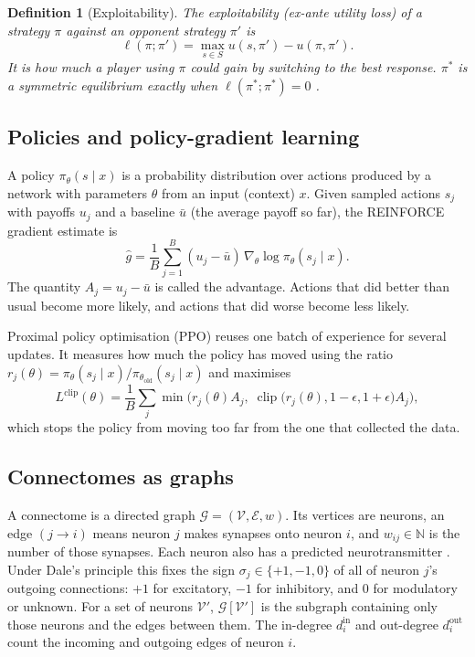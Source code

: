 \documentclass{article}
\newtheorem{definition}{Definition}
\newcommand{\G}{\mathcal{G}}
\newcommand{\Vset}{\mathcal{V}}
\newcommand{\Eset}{\mathcal{E}}
\newcommand{\clip}{\operatorname{clip}}
\newcommand{\expl}{\ell}
\begin{document}
\begin{definition}[Exploitability]
The exploitability (ex-ante utility loss) of a strategy $\pi$ against an opponent strategy $\pi'$ is
\[
\expl(\pi;\pi') = \max_{s\in S} u(s,\pi') - u(\pi,\pi').
\]
It is how much a player using $\pi$ could gain by switching to the best response. $\pi^*$ is a symmetric equilibrium exactly when $\expl(\pi^*;\pi^*) = 0$ \citep{bichler2021}.
\end{definition}

\subsection{Policies and policy-gradient learning}

A policy $\pi_\theta(s \mid x)$ is a probability distribution over actions produced by a network with parameters $\theta$ from an input (context) $x$. Given sampled actions $s_j$ with payoffs $u_j$ and a baseline $\bar u$ (the average payoff so far), the REINFORCE gradient estimate \citep{williams1992} is
\[
\hat g = \frac1B \sum_{j=1}^{B} (u_j - \bar u)\, \nabla_\theta \log \pi_\theta(s_j \mid x).
\]
The quantity $A_j = u_j - \bar u$ is called the advantage. Actions that did better than usual become more likely, and actions that did worse become less likely.

Proximal policy optimisation (PPO) \citep{schulman2017} reuses one batch of experience for several updates. It measures how much the policy has moved using the ratio $r_j(\theta) = \pi_\theta(s_j\mid x)/\pi_{\theta_{\mathrm{old}}}(s_j \mid x)$ and maximises
\[
L^{\mathrm{clip}}(\theta) = \frac1B \sum_j \min\!\Big( r_j(\theta) A_j,\; \clip\big(r_j(\theta), 1-\epsilon, 1+\epsilon\big) A_j\Big),
\]
which stops the policy from moving too far from the one that collected the data.

\subsection{Connectomes as graphs}

A connectome is a directed graph $\G = (\Vset, \Eset, w)$. Its vertices are neurons, an edge $(j \to i)$ means neuron $j$ makes synapses onto neuron $i$, and $w_{ij} \in \mathbb N$ is the number of those synapses. Each neuron also has a predicted neurotransmitter \citep{eckstein2024}. Under Dale's principle this fixes the sign $\sigma_j \in \{+1,-1,0\}$ of all of neuron $j$'s outgoing connections: $+1$ for excitatory, $-1$ for inhibitory, and $0$ for modulatory or unknown. For a set of neurons $\Vset'$, $\G[\Vset']$ is the subgraph containing only those neurons and the edges between them. The in-degree $d^{\mathrm{in}}_i$ and out-degree $d^{\mathrm{out}}_i$ count the incoming and outgoing edges of neuron $i$.
\end{document}
